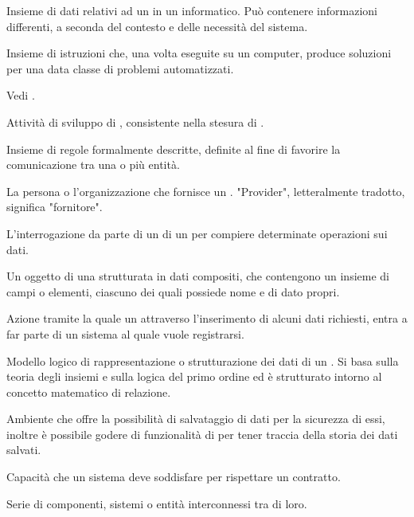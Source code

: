 {Insieme di dati relativi ad un  in un  informatico. Può contenere informazioni differenti, a seconda del contesto e delle necessità del sistema.}

{Insieme di istruzioni che, una volta eseguite su un computer, produce soluzioni per una data classe di problemi automatizzati.}

{Vedi .}

{Attività di sviluppo di , consistente nella stesura di .}

{Insieme di regole formalmente descritte, definite al fine di favorire la comunicazione tra una o più entità.}

{La persona o l'organizzazione che fornisce un . "Provider", letteralmente tradotto, significa "fornitore".}




{L'interrogazione da parte di un  di un  per compiere determinate operazioni sui dati.}




{Un oggetto di una  strutturata in dati compositi, che contengono un insieme di campi o elementi, ciascuno dei quali possiede nome e  di dato propri.}

{Azione tramite la quale un  attraverso l'inserimento di alcuni dati richiesti, entra a far parte di un sistema al quale vuole registrarsi.}

{Modello logico di rappresentazione o strutturazione dei dati di un . Si basa sulla teoria degli insiemi e sulla logica del primo ordine ed è strutturato intorno al concetto matematico di relazione.}

{Ambiente che offre la possibilità di salvataggio di dati per la sicurezza di essi, inoltre è possibile godere di funzionalità di  per tener traccia della storia dei dati salvati.}

{Capacità che un sistema  deve soddisfare per rispettare un contratto.}

{Serie di componenti, sistemi o entità interconnessi tra di loro.}

